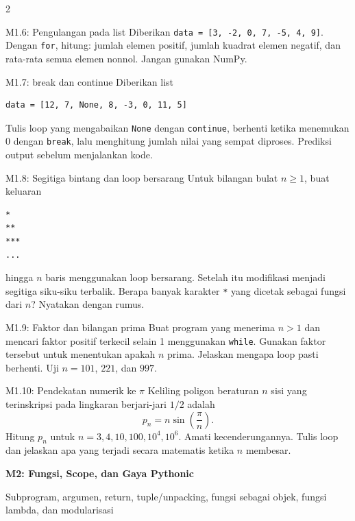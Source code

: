 \documentclass[9pt,a4paper]{article}
\newcommand{\bab}[2]{%
  \vspace{2pt}
  {\color{iteraBlue}\Large\bfseries #1}\par
  {\color{darkgray}\small #2}\par\vspace{3pt}
}
\begin{document}
\begin{multicols}{2}
\begin{qbox}[L2]{M1.6: Pengulangan pada list}
Diberikan \texttt{data = [3, -2, 0, 7, -5, 4, 9]}. Dengan \texttt{for}, hitung: jumlah elemen positif, jumlah kuadrat elemen negatif, dan rata-rata semua elemen nonnol. Jangan gunakan NumPy.
\end{qbox}

\begin{qbox}[L3]{M1.7: break dan continue}
Diberikan list
\begin{lstlisting}
data = [12, 7, None, 8, -3, 0, 11, 5]
\end{lstlisting}
Tulis loop yang mengabaikan \texttt{None} dengan \texttt{continue}, berhenti ketika menemukan 0 dengan \texttt{break}, lalu menghitung jumlah nilai yang sempat diproses. Prediksi output sebelum menjalankan kode.
\end{qbox}

\begin{qbox}[L3]{M1.8: Segitiga bintang dan loop bersarang}
Untuk bilangan bulat $n\ge 1$, buat keluaran
\begin{lstlisting}
*
**
***
...
\end{lstlisting}
hingga $n$ baris menggunakan loop bersarang. Setelah itu modifikasi menjadi segitiga siku-siku terbalik. Berapa banyak karakter \texttt{*} yang dicetak sebagai fungsi dari $n$? Nyatakan dengan rumus.
\end{qbox}

\begin{qbox}[L4]{M1.9: Faktor dan bilangan prima}
Buat program yang menerima $n>1$ dan mencari faktor positif terkecil selain 1 menggunakan \texttt{while}. Gunakan faktor tersebut untuk menentukan apakah $n$ prima. Jelaskan mengapa loop pasti berhenti. Uji $n=101$, $221$, dan $997$.
\end{qbox}

\begin{qbox}[L4]{M1.10: Pendekatan numerik ke $\pi$}
Keliling poligon beraturan $n$ sisi yang terinskripsi pada lingkaran berjari-jari $1/2$ adalah
\[
p_n=n\sin\left(\frac{\pi}{n}\right).
\]
Hitung $p_n$ untuk $n=3,4,10,100,10^4,10^6$. Amati kecenderungannya. Tulis loop dan jelaskan apa yang terjadi secara matematis ketika $n$ membesar.
\end{qbox}




\bab{M2: Fungsi, Scope, dan Gaya Pythonic}{Subprogram, argumen, return, tuple/unpacking, fungsi sebagai objek, fungsi lambda, dan modularisasi}


\end{multicols}
\end{document}
